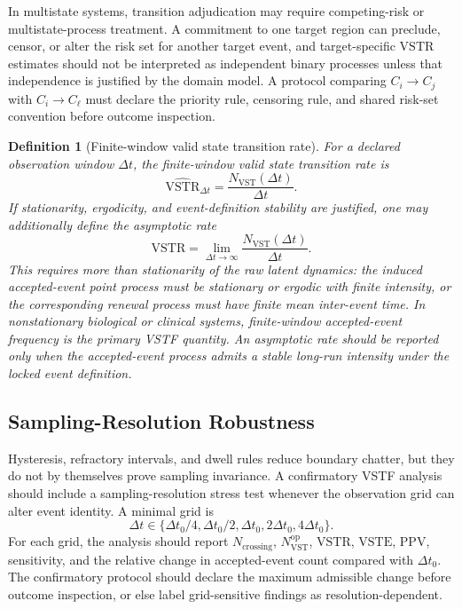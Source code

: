 \documentclass[11pt,a4paper]{article}
\newtheorem{definition}{Definition}
\newcommand{\VST}{\ensuremath{\mathrm{VST}}}
\newcommand{\VSTR}{\ensuremath{\mathrm{VSTR}}}
\newcommand{\VSTE}{\ensuremath{\mathrm{VSTE}}}
\newcommand{\1}{\mathbf{1}}
\begin{document}
In multistate systems, transition adjudication may require competing-risk or multistate-process treatment. A commitment to one target region can preclude, censor, or alter the risk set for another target event, and target-specific \VSTR{} estimates should not be interpreted as independent binary processes unless that independence is justified by the domain model. A protocol comparing $C_i\to C_j$ with $C_i\to C_\ell$ must declare the priority rule, censoring rule, and shared risk-set convention before outcome inspection.

\begin{definition}[Finite-window valid state transition rate]
For a declared observation window $\Delta t$, the finite-window valid state transition rate is
\[
  \widehat{\VSTR}_{\Delta t}=\frac{N_{\VST}(\Delta t)}{\Delta t}.
\]
If stationarity, ergodicity, and event-definition stability are justified, one may additionally define the asymptotic rate
\[
  \VSTR = \lim_{\Delta t\to\infty}\frac{N_{\VST}(\Delta t)}{\Delta t}.
\]
This requires more than stationarity of the raw latent dynamics: the induced accepted-event point process must be stationary or ergodic with finite intensity, or the corresponding renewal process must have finite mean inter-event time. In nonstationary biological or clinical systems, finite-window accepted-event frequency is the primary VSTF quantity. An asymptotic rate should be reported only when the accepted-event process admits a stable long-run intensity under the locked event definition.
\end{definition}

\subsection{Sampling-Resolution Robustness}

Hysteresis, refractory intervals, and dwell rules reduce boundary chatter, but they do not by themselves prove sampling invariance. A confirmatory VSTF analysis should include a sampling-resolution stress test whenever the observation grid can alter event identity. A minimal grid is
\[
  \Delta t\in\{\Delta t_0/4,\Delta t_0/2,\Delta t_0,2\Delta t_0,4\Delta t_0\}.
\]
For each grid, the analysis should report $N_{\mathrm{crossing}}$, $N_{\VST}^{\mathrm{op}}$, \VSTR{}, \VSTE{}, PPV, sensitivity, and the relative change in accepted-event count compared with $\Delta t_0$. The confirmatory protocol should declare the maximum admissible change before outcome inspection, or else label grid-sensitive findings as resolution-dependent.
\end{document}
